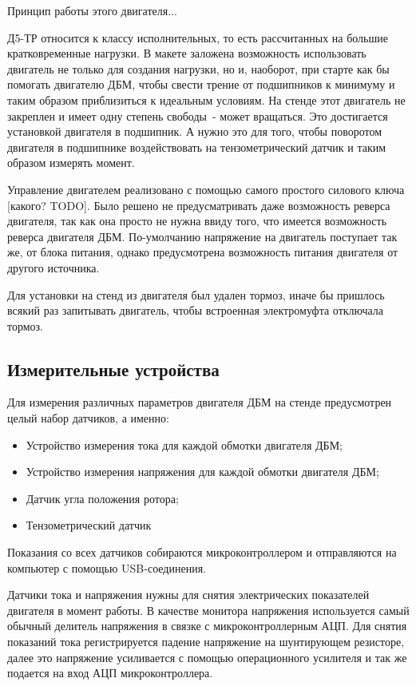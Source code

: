 Принцип работы этого двигателя...

Д5-ТР относится к классу исполнительных, то есть рассчитанных на большие 
кратковременные нагрузки. В макете заложена возможность использовать двигатель не только для
создания нагрузки, но и, наоборот, при старте как бы помогать двигателю ДБМ, чтобы
свести трение от подшипников к минимуму и таким образом приблизиться к идеальным условиям.
На стенде этот двигатель не закреплен и имеет одну степень свободы~- может вращаться. Это
достигается установкой двигателя в подшипник. А нужно это для того, чтобы поворотом двигателя в 
подшипнике воздействовать на тензометрический датчик и таким образом измерять момент.

Управление двигателем реализовано с помощью самого простого силового ключа [какого? TODO].
Было решено не предусматривать даже возможность реверса двигателя, так как она просто не нужна
ввиду того, что имеется возможность реверса двигателя ДБМ. По-умолчанию напряжение на двигатель 
поступает так же, от блока питания, однако предусмотрена возможность питания двигателя от другого 
источника.

Для установки на стенд из двигателя был удален тормоз, иначе бы пришлось всякий раз 
запитывать двигатель, чтобы встроенная электромуфта отключала тормоз.

\subsection{Измерительные устройства}

Для измерения различных параметров двигателя ДБМ на стенде предусмотрен целый набор датчиков,
а именно:

\begin{itemize}
  \item Устройство измерения тока для каждой обмотки двигателя ДБМ;
  \item Устройство измерения напряжения для каждой обмотки двигателя ДБМ;
  \item Датчик угла положения ротора;
  \item Тензометрический датчик
\end{itemize}

Показания со всех датчиков собираются микроконтроллером и отправляются на компьютер
с помощью USB-соединения.

Датчики тока и напряжения нужны для снятия электрических показателей двигателя в момент работы.
В качестве монитора напряжения используется самый обычный делитель напряжения в связке
с микроконтроллерным АЦП. Для снятия показаний тока регистрируется падение напряжение на 
шунтирующем резисторе, далее это напряжение усиливается с помощью операционного усилителя и так же
подается на вход АЦП микроконтроллера.

